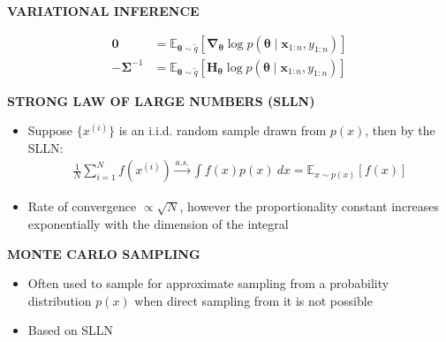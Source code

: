 \begin{whitebox}{\textbf{VARIATIONAL INFERENCE}}
\begin{itemize}
\begin{itemize}
            \begin{align*}
                \bm{0}&=\mathbb{E}_{\bm{\theta}\sim\tilde{q}}[\bm{\nabla}_{\bm{\theta}}\log p(\bm{\theta}\mid \bm{x}_{1:n},y_{1:n})]\\
                -\bm{\Sigma}^{-1}&=\mathbb{E}_{\bm{\theta}\sim\tilde{q}}[\bm{H}_{\bm{\theta}}\log p(\bm{\theta}\mid \bm{x}_{1:n},y_{1:n})]
            \end{align*}
        \end{itemize}
    \end{itemize}
\end{whitebox}

\begin{whitebox}{\textbf{STRONG LAW OF LARGE NUMBERS (SLLN)}}
    \begin{itemize}
        \item Suppose $\{x^{(i)}\}$ is an i.i.d. random sample drawn from $p(x)$, then by the SLLN:
        \begin{align*}
            \frac{1}{N}\sum_{i=1}^Nf\left(x^{(i)}\right)\overset{a.s.}{\to}\int f(x)p(x)\ dx=\mathbb{E}_{x\sim p(x)}[f(x)]
        \end{align*}
        \item Rate of convergence $\propto\sqrt{N}$, however the proportionality constant increases exponentially with the dimension of the integral
    \end{itemize}
\end{whitebox}

\begin{whitebox}{\textbf{MONTE CARLO SAMPLING}}
    \begin{itemize}
        \item Often used to sample for approximate sampling from a probability distribution $p(x)$ when direct sampling from it is not possible
        \item Based on SLLN
    \end{itemize}
\end{whitebox}

